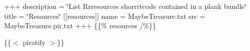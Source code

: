 +++ description = \char`\"{}\+List Rrresources shorrrtcode contained in a plank bundle\char`\"{} title = \char`\"{}\+Resources\char`\"{} \mbox{[}\mbox{[}resources\mbox{]}\mbox{]} name = \textquotesingle{}Maybe\+Treasure.\+txt\textquotesingle{} src = \textquotesingle{}Maybe\+Treasure.\+pir.\+txt\textquotesingle{} +++ \{\{\% resources /\%\}\}

\{\{$<$ piratify $>$\}\} 